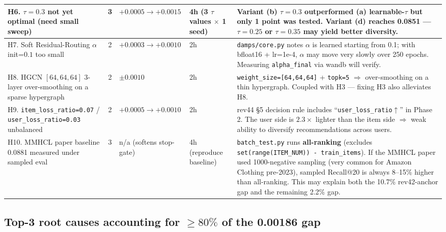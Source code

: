 \documentclass[11pt,a4paper]{article}
\begin{document}
\begin{longtable}{|p{3.6cm}|c|p{3.0cm}|p{2.4cm}|p{5.2cm}|}
H6. $\tau=0.3$ not yet optimal (need small sweep) & 3 & $+0.0005 \to +0.0015$ & 4h (3 $\tau$ values $\times$ 1 seed) &
Variant (b) $\tau=0.3$ outperformed (a) learnable-$\tau$ but only 1 point was tested. Variant (d) reaches 0.0851 --- $\tau=0.25$ or $\tau=0.35$ may yield better diversity. \\ \hline

H7. Soft Residual-Routing $\alpha$ init=$0.1$ too small & 2 & $+0.0003 \to +0.0010$ & 2h &
\texttt{damps/core.py} notes $\alpha$ is learned starting from 0.1; with bfloat16 + lr=1e-4, $\alpha$ may move very slowly over 250 epochs. Measuring \texttt{alpha\_final} via wandb will verify. \\ \hline

H8. HGCN $[64,64,64]$ 3-layer over-smoothing on a sparse hypergraph & 2 & $\pm 0.0010$ & 2h &
\texttt{weight\_size=[64,64,64]} + \texttt{topk=5} $\Rightarrow$ over-smoothing on a thin hypergraph. Coupled with H3 --- fixing H3 also alleviates H8. \\ \hline

H9. \texttt{item\_loss\_ratio=0.07} / \texttt{user\_loss\_ratio=0.03} unbalanced & 2 & $+0.0005 \to +0.0010$ & 2h &
rev44 \S5 decision rule includes ``\texttt{user\_loss\_ratio}$\uparrow$'' in Phase 2. The user side is $2.3\times$ lighter than the item side $\Rightarrow$ weak ability to diversify recommendations across users. \\ \hline

H10. MMHCL paper baseline 0.0881 measured under sampled eval & 3 & n/a (softens stop-gate) & 4h (reproduce baseline) &
\texttt{batch\_test.py} runs \textbf{all-ranking} (excludes \texttt{set(range(ITEM\_NUM)) - train\_items}). If the MMHCL paper used 1000-negative sampling (very common for Amazon Clothing pre-2023), sampled Recall@20 is always 8--15\% higher than all-ranking. This may explain both the 10.7\% rev42-anchor gap and the remaining 2.2\% gap. \\ \hline

\end{longtable}

\subsection*{Top-3 root causes accounting for $\geq 80\%$ of the 0.00186 gap}
\end{document}
